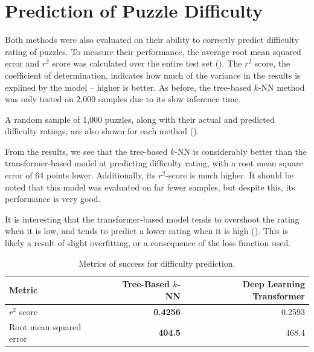 \section{Prediction of Puzzle Difficulty}\label{evalS2}

Both methods were also evaluated on their ability to correctly predict
difficulty rating of puzzles. To measure their performance, the average root
mean squared error and $r^2$ score was calculated over the entire test set
(). The $r^2$ score, the coefficient of determination,
indicates how much of the variance in the results is explined by the model --
higher is better. As before, the tree-based $k$-NN method was only tested on
2,000 samples due to its slow inference time. 

A random sample of 1,000 puzzles, along with their actual and predicted
difficulty ratings, are also shown for each method
().

From the results, we see that the tree-based $k$-NN is considerably better than
the transformer-based model at predicting difficulty rating, with a root mean
square error of 64 points lower. Additionally, its $r^2$-score is much higher.
It should be noted that this model was evaluated on far fewer samples, but
despite this, its performance is very good.

It is interesting that the transformer-based model tends to overshoot the
rating when it is low, and tends to predict a lower rating when it is high
(). This is likely a result of slight overfitting, or a
consequence of the loss function used.

\begin{table}[H]
  \centering
  \begin{tabular}{l|rr}
    Metric & Tree-Based $k$-NN & Deep Learning Transformer \\
    \hline
    $r^2$ score & \textbf{0.4256} & 0.2593 \\
    Root mean squared error & \textbf{404.5} & 468.4 \\
  \end{tabular}
  \caption{Metrics of success for difficulty prediction.}
  \label{diffTable}
\end{table}

